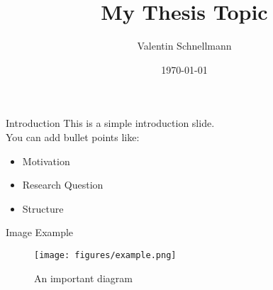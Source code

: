 \documentclass{beamer}
\title{My Thesis Topic}
\author{Valentin Schnellmann}
\date{\today}
\begin{document}
\frame{\titlepage}

\begin{frame}{Introduction}
This is a simple introduction slide.\\
You can add bullet points like:
\begin{itemize}
    \item Motivation
    \item Research Question
    \item Structure
\end{itemize}
\end{frame}

\begin{frame}{Image Example}
\begin{figure}
    \centering
    \texttt{[image: figures/example.png]}
    \caption{An important diagram}
\end{figure}
\end{frame}
\end{document}
